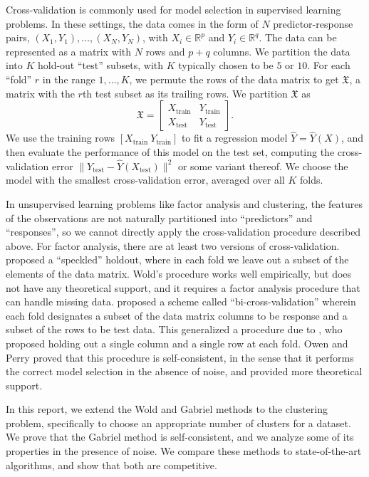 \documentclass[11pt]{article}
\newcommand{\R}{\mathbb{R}}
\newcommand{\dataX}{\mathfrak{X}}
\newcommand{\Xtrain}{X_{\text{train}}}
\newcommand{\Ytrain}{Y_{\text{train}}}
\newcommand{\Xtest}{X_{\text{test}}}
\newcommand{\Ytest}{Y_{\text{test}}}
\begin{document}
Cross-validation is commonly used for model selection in supervised learning
problems.  In these settings, the data comes in the form of $N$
predictor-response pairs, $(X_1, Y_1), \dotsc, (X_N, Y_N)$, with $X_i \in
\R^{p}$ and $Y_i \in \R^{q}$.  The data can be represented as a matrix with
$N$ rows and $p + q$ columns.  We partition the data into $K$ hold-out
``test'' subsets, with $K$ typically chosen to be $5$ or $10$.  For each
``fold'' $r$ in the range $1, \dotsc, K$, we permute the rows of the data
matrix to get $\dataX$, a matrix with the $r$th test subset as its trailing
rows.  We partition $\dataX$ as
\[
  \dataX =
  \begin{bmatrix}
    \Xtrain & \Ytrain \\
    \Xtest  & \Ytest
  \end{bmatrix}.
\]
We use the training rows $[ \Xtrain\ \Ytrain ]$ to fit a regression model
$\hat Y = \hat Y(X)$, and then evaluate the performance of this model on the
test set, computing the cross-validation error $\|\Ytest - \hat Y(\Xtest)\|^2$
or some variant thereof.  We choose the model with the smallest
cross-validation error, averaged over all $K$ folds.


In unsupervised learning problems like factor analysis and clustering, the
features of the observations are not naturally partitioned into ``predictors''
and ``responses'', so we cannot directly apply the cross-validation procedure
described above.  For factor analysis, there are at least two versions of
cross-validation.  \citet{wold78cross} proposed a ``speckled'' holdout, where
in each fold we leave out a subset of the elements of the data matrix.  Wold's
procedure works well empirically, but does not have any theoretical support,
and it requires a factor analysis procedure that can handle missing data.
\citet{owen2009bi} proposed a scheme called ``bi-cross-validation'' wherein
each fold designates a subset of the data matrix columns to be response and a
subset of the rows to be test data.  This generalized a procedure due to
\citet{gabriel2002biblot}, who proposed holding out a single column and a
single row at each fold.  Owen and Perry proved that this procedure is
self-consistent, in the sense that it performs the correct model selection in
the absence of noise, and \citet{perry2009cross} provided more theoretical
support.


In this report, we extend the Wold and Gabriel methods to the clustering
problem, specifically to choose an appropriate number of clusters for a
dataset.  We prove that the Gabriel method is self-consistent, and we analyze
some of its properties in the presence of noise.  We compare these methods to
state-of-the-art algorithms, and show that both are competitive.
\end{document}
